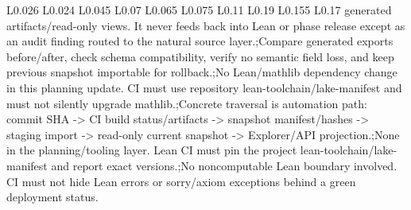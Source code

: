 \begin{longtable}{L{0.026\linewidth} L{0.024\linewidth} L{0.045\linewidth} L{0.07\linewidth} L{0.065\linewidth} L{0.075\linewidth} L{0.11\linewidth} L{0.19\linewidth} L{0.155\linewidth} L{0.17\linewidth}}
generated artifacts/\allowbreak{}read-only views. It never feeds back into Lean or phase release except as an audit finding routed to the natural source layer.;\newline Compare generated exports before/\allowbreak{}after, check schema compatibility, verify no semantic field loss, and keep previous snapshot importable for rollback.;\newline No Lean/\allowbreak{}mathlib dependency change in this planning update. CI must use repository lean-toolchain/\allowbreak{}lake-manifest and must not silently upgrade mathlib.;\newline Concrete traversal is automation path: commit SHA -> CI build status/\allowbreak{}artifacts -> snapshot manifest/\allowbreak{}hashes -> staging import -> read-only current snapshot -> Explorer/\allowbreak{}API projection.;\newline None in the planning/\allowbreak{}tooling layer. Lean CI must pin the project lean-toolchain/\allowbreak{}lake-manifest and report exact versions.;\newline No noncomputable Lean boundary involved. CI must not hide Lean errors or sorry/\allowbreak{}axiom exceptions behind a green deployment status.\\
\hline
\addlinespace[0.24em]

\end{longtable}
